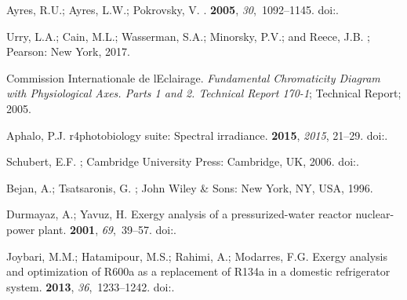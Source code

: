 \documentclass[energies,article,accept,moreauthors,pdftex]{Definitions/mdpi}\usepackage[]{graphicx}\usepackage[]{color}
\begin{document}
\begin{thebibliography}{999}
Ayres, R.U.; Ayres, L.W.; Pokrovsky, V.
.
 {\bf 2005}, {\em 30},~1092--1145.
\newblock
  doi:{\href{https://doi.org/10.1016/j.energy.2004.07.012}{}}.%

Urry, L.A.; Cain, M.L.; Wasserman, S.A.; Minorsky, P.V.; and Reece, J.B.
; Pearson: New York, 2017.%


Commission Internationale de l\textquotesingle{}Eclairage.
\newblock \emph{Fundamental Chromaticity Diagram with Physiological Axes. Parts 1 and
  2. Technical Report 170-1};
\newblock Technical Report;  2005.%

Aphalo, P.J.
\newblock r4photobiology suite: Spectral irradiance.
 {\bf 2015}, \emph{2015}, 21--29.
\newblock
  doi:{\href{https://doi.org/10.19232/uv4pb.2015.1.14}{}}.%

Schubert, E.F.
; Cambridge University Press: Cambridge,
  UK,  2006.
\newblock
  doi:{\href{https://doi.org/10.1017/CBO9780511790546}{}}.%


Bejan, A.; Tsatsaronis, G.
; John Wiley \& Sons: New York, NY, USA,
  1996.%

Durmayaz, A.; Yavuz, H.
\newblock Exergy analysis of a pressurized-water reactor nuclear-power plant.
 {\bf 2001}, {\em 69},~39--57.
\newblock
  doi:{\href{https://doi.org/10.1016/s0306-2619(00)00071-4}{}}.%

Joybari, M.M.; Hatamipour, M.S.; Rahimi, A.; Modarres, F.G.
\newblock Exergy analysis and optimization of {R600a} as a replacement of
  {R134a} in a domestic refrigerator system.
 {\bf 2013}, {\em
  36},~1233--1242.
\newblock
  doi:{\href{https://doi.org/10.1016/j.ijrefrig.2013.02.012}{}}.%


\end{thebibliography}
\end{document}
